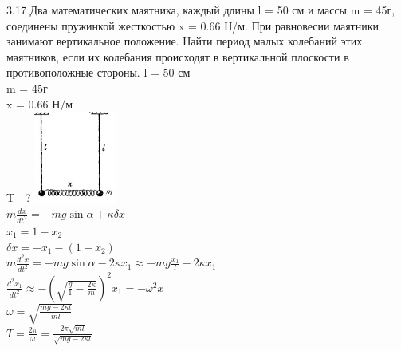 \testCom
{%
	3.17
}
{%
	Два математических маятника, каждый длины l = 50 см и массы m = 45г, соединены пружинкой жесткостью x = 0.66 Н/м. При равновесии маятники занимают вертикальное положение. Найти период малых колебаний этих маятников, если их колебания происходят в вертикальной плоскости в противоположные стороны.
}
{%
	l = 50 см\\
	m = 45г\\
	x = 0.66 Н/м\\
}
{%
	T - ?
}
{%
	\includegraphics[height=30mm]{3_17.jpg}\\
	$m \frac{dx}{dt^2} = - m g \sin \alpha + \kappa \delta x$\\
	${x}_{1} = 1 - {x}_{2}$\\
	$\delta x = - {x}_{1} - (1 - {x}_{2})$\\
	$m\frac{d^2x}{dt^2}= -mg\sin \alpha - 2 \kappa {x}_{1} \approx - mg \frac{{x}_{1}}{l} - 2\kappa {x}_{1} $\\
	$\frac{d^2{x}_{1}}{dt^2} \approx - (\sqrt{\frac{g}{1} - \frac{2 \kappa}{m}})^2 {x}_{1} = - \omega ^2 x$\\
	$\omega = \sqrt{\frac{mg - 2 \kappa l}{ml}}$\\
	$T=\frac{2 \pi}{\omega} = \frac{2\pi \sqrt{ml}}{\sqrt{mg - 2 \kappa l}}$\
}


